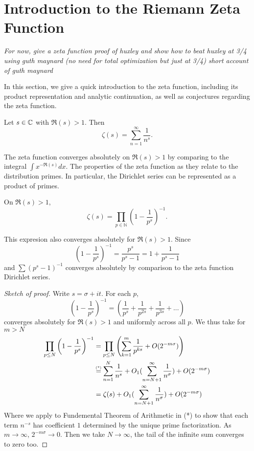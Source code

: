 \section{Introduction to the Riemann Zeta Function}
\textit{For now, give a zeta function proof of huxley and show how to beat huxley at 3/4 
using guth maynard (no need for total optimization but just at 3/4)
short account of guth maynard}

In this section, we give a quick introduction to the zeta function, including its product representation and analytic continuation,
as well as conjectures regarding the zeta function.
\begin{definition}
	Let $s\in\mathbb{C}$ with $\Re(s)>1$. Then \begin{equation}
	\zeta(s)=\sum_{n=1}^{\infty}\frac{1}{n^s}.
	\end{equation}
\end{definition}
The zeta function converges absolutely on $\Re(s)>1$ by comparing to the integral $\int x^{-\Re(s)} dx$.
The properties of the zeta function as they relate to the distribution primes. In particular, the Dirichlet series can be represented as a product of primes.
\begin{proposition}\label{eulerproduct}
	On $\Re(s)>1$, \begin{equation}
		\zeta(s) = \prod_{p\in\mathbb{N}}\left(1-\frac{1}{p^s}\right)^{-1}.	
	\end{equation}
\end{proposition}
\begin{remark}
	This expresion also converges absolutely for $\Re(s)>1$. Since \[
		\left(1-\frac{1}{p^s}\right)^{-1} = \frac{p^s}{p^s-1} = 1 + \frac{1}{p^s-1}
	\]
	and $\sum(p^s-1)^{-1}$ converges absolutely by comparison to the zeta function Dirichlet series.
\end{remark}
\begin{proof}[Sketch of proof]
	Write $s=\sigma+it$. For each $p$,\[
		\left(1-\frac{1}{p^s}\right)^{-1} = \left(\frac{1}{p^s}+\frac{1}{p^{2s}}+\frac{1}{p^{3s}}+...\right)
	\]
	converges absolutely for $\Re(s)>1$ and uniformly across all $p$. We thus take for $m>N$ \begin{align*}
		\prod_{p\leq N}\left(1-\frac{1}{p^s}\right)^{-1}  &= \prod_{p\leq N}\left(\sum_{k=1}^{m} \frac{1}{p^{ks}}+O(2^{-m\sigma})\right)\\
		&\stackeq{(*)}\sum_{n=1}^{N}\frac{1}{n^s}+O_1(\sum_{n=N+1}^{\infty} \frac{1}{n^\sigma}) + O(2^{-m\sigma})\\
		&=\zeta(s) + O_1(\sum_{n=N+1}^{\infty} \frac{1}{n^\sigma}) + O(2^{-m\sigma})
	\end{align*}
	Where we apply to Fundemental Theorem of Arithmetic in (*) to show that each term $n^{-s}$ has coefficient $1$ determined by the unique prime factorization.
	As $m\to\infty$, $2^{-m\sigma} \to 0$. Then we take $N\to\infty$, the tail of the infinite sum converges to zero too.
\end{proof}
